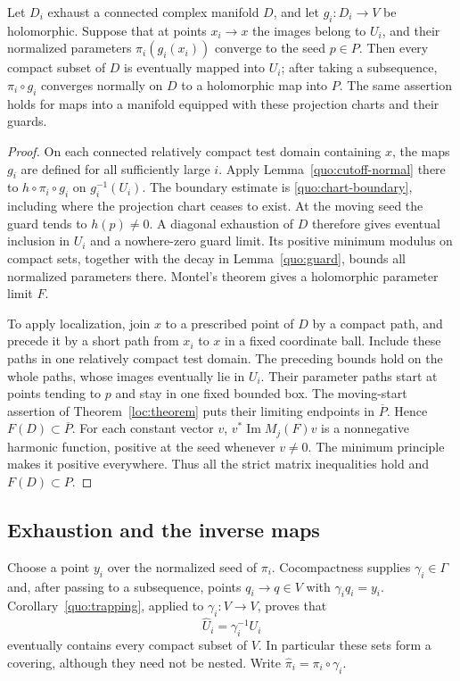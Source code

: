 \begin{corollary}\label{quo:trapping}
Let \(D_i\) exhaust a connected complex manifold \(D\), and let
\(g_i:D_i\to V\) be holomorphic. Suppose that at points
\(x_i\to x\) the images belong to \(U_i\), and their normalized
parameters \(\pi_i(g_i(x_i))\) converge to the seed \(p\in P\).
Then every compact subset of \(D\) is eventually mapped into
\(U_i\); after taking a subsequence, \(\pi_i\circ g_i\) converges
normally on \(D\) to a holomorphic map into \(P\). The same
assertion holds for maps into a manifold equipped with these
projection charts and their guards.
\end{corollary}
\begin{proof}
On each connected relatively compact test domain containing
\(x\), the maps \(g_i\) are defined for all sufficiently large
\(i\). Apply Lemma~\ref{quo:cutoff-normal} there to
\(h\circ\pi_i\circ g_i\) on \(g_i^{-1}(U_i)\).
The boundary estimate is \eqref{quo:chart-boundary}, including
where the projection chart ceases to exist. At the moving seed
the guard tends to \(h(p)\ne0\). A diagonal exhaustion of \(D\)
therefore gives eventual inclusion in \(U_i\) and a nowhere-zero
guard limit. Its positive minimum modulus on compact sets,
together with the decay in Lemma~\ref{quo:guard}, bounds all
normalized parameters there. Montel's theorem gives a holomorphic
parameter limit \(F\).

To apply localization, join \(x\) to a prescribed point of \(D\)
by a compact path, and precede it by a short path from \(x_i\)
to \(x\) in a fixed coordinate ball. Include these paths in one
relatively compact test domain. The preceding bounds hold
on the whole paths, whose images eventually lie in \(U_i\).
Their parameter paths start at points tending to \(p\) and stay
in one fixed bounded box. The moving-start assertion of
Theorem~\ref{loc:theorem} puts their limiting endpoints in
\(\overline P\). Hence \(F(D)\subset\overline P\). For each constant vector \(v\),
\(v^*\operatorname{Im}M_j(F)v\) is a nonnegative harmonic
function, positive at the seed whenever \(v\ne0\). The minimum
principle makes it positive everywhere. Thus all the strict
matrix inequalities hold and \(F(D)\subset P\).
\end{proof}

\subsection{Exhaustion and the inverse maps}

Choose a point \(y_i\) over the normalized seed of \(\pi_i\).
Cocompactness supplies \(\gamma_i\in\Gamma\) and, after passing
to a subsequence, points \(q_i\to q\in V\) with
\(\gamma_iq_i=y_i\). Corollary~\ref{quo:trapping}, applied to
\(\gamma_i:V\to V\), proves that
\[
 \widehat U_i=\gamma_i^{-1}U_i
\]
eventually contains every compact subset of \(V\). In particular
these sets form a covering, although they need not be nested.
Write \(\widehat\pi_i=\pi_i\circ\gamma_i\).


